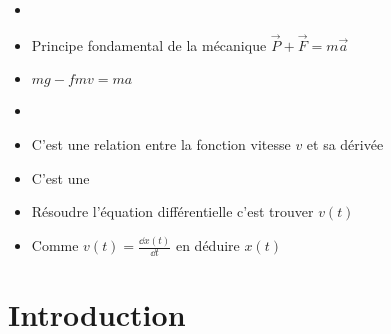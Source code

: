 \begin{frame}

\begin{minipage}{0.59\textwidth}
\begin{itemize}
  \item {}
\end{itemize}  
\end{minipage}
\begin{minipage}{0.39\textwidth}
\end{minipage}

\pause\pause\pause\pause\pause
\vspace*{-1ex}
\begin{itemize}[<+->]
  \item Principe fondamental de la mécanique $\vec{P}+\vec{F} = m\vec{a}$
  \item $mg - fmv = ma$
  \item {}
  \item C'est une relation entre la fonction vitesse $v$ et sa dérivée 
  \item C'est une 
  \item Résoudre l'équation différentielle c'est trouver $v(t)$
  \item Comme $v(t) = \frac{\dd x(t)}{\dd t}$ en déduire $x(t)$
\end{itemize}

\end{frame}





\section*{Introduction}

